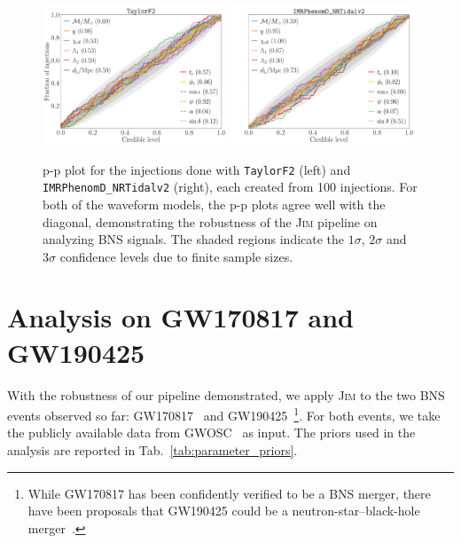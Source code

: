 \documentclass[prd,twocolumn,a4paper,floatfix,nofootinbib,preprintnumbers,superscriptaddress]{revtex4-1}
\begin{document}
\begin{figure}
     \includegraphics[width=0.49\textwidth]{pp_plot_TF2.pdf}
     \includegraphics[width=0.49\textwidth]{pp_plot_NRTv2.pdf}
    \caption{\ac{p-p} plot for the injections done with \texttt{TaylorF2} (left) and \texttt{IMRPhenomD\_NRTidalv2} (right), each created from 100 injections. For both of the waveform models, the \ac{p-p} plots agree well with the diagonal, demonstrating the robustness of the \textsc{Jim} pipeline on analyzing \ac{BNS} signals. The shaded regions indicate the $1\sigma$, $2\sigma$ and $3\sigma$ confidence levels due to finite sample sizes.}
    \label{fig:pp plots}
\end{figure}

\section{Analysis on GW170817 and GW190425} \label{sec:result}
With the robustness of our pipeline demonstrated, we apply \textsc{Jim} to the two \ac{BNS} events observed so far: GW170817~\cite{LIGOScientific:2017vwq} and GW190425~\cite{LIGOScientific:2020aai}\footnote{While GW170817 has been confidently verified to be a \ac{BNS} merger, there have been proposals that GW190425 could be a neutron-star–black-hole merger~\cite{Foley:2020kus, Han:2020qmn,Kyutoku:2020xka,Hinderer:2018pei, Coughlin:2019kqf}.}. For both events, we take the publicly available data from GWOSC~\cite{LIGOScientific:2019lzm, KAGRA:2023pio} as input. The priors used in the analysis are reported in Tab.~\ref{tab:parameter_priors}.
\end{document}
